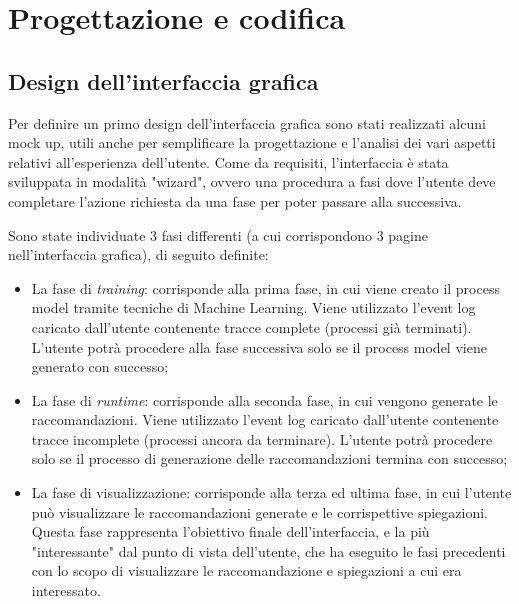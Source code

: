 
\chapter{Progettazione e codifica}
\label{cap5}

\section{Design dell'interfaccia grafica}
\label{sec:design-gui}
Per definire un primo design dell'interfaccia grafica sono stati realizzati alcuni \gls{mock up}, utili anche per semplificare la progettazione e l'analisi dei vari aspetti relativi all'esperienza dell'utente.
Come da requisiti, l'interfaccia è stata sviluppata in modalità "wizard", ovvero una procedura a fasi dove l'utente deve completare l'azione richiesta da una fase per poter passare alla successiva.

Sono state individuate 3 fasi differenti (a cui corrispondono 3 pagine nell'interfaccia grafica), di seguito definite:

\begin{itemize}
\item La fase di \textit{training}: corrisponde alla prima fase, in cui viene creato il process model tramite tecniche di Machine Learning. Viene utilizzato l'event log caricato dall'utente contenente tracce complete (processi già terminati). L'utente potrà procedere alla fase successiva solo se il process model viene generato con successo;

\item La fase di \textit{runtime}: corrisponde alla seconda fase, in cui vengono generate le raccomandazioni. Viene utilizzato l'event log caricato dall'utente contenente tracce incomplete (processi ancora da terminare). L'utente potrà procedere solo se il processo di generazione delle raccomandazioni termina con successo;

\item La fase di visualizzazione: corrisponde alla terza ed ultima fase, in cui l'utente può visualizzare le raccomandazioni generate e le corrispettive spiegazioni. Questa fase rappresenta l'obiettivo finale dell'interfaccia, e la più "interessante" dal punto di vista dell'utente, che ha eseguito le fasi precedenti con lo scopo di visualizzare le raccomandazione e spiegazioni a cui era interessato.

\end{itemize}

